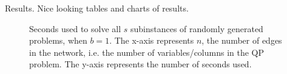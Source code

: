 Results. Nice looking tables and charts of results.
\begin{figure}[ht!]
    \centering
    
    \caption{Seconds used to solve all $s$ subinstances of randomly generated
             problems, when $b = 1$. The x-axis represents $n$, the number of
             edges in the network, i.e. the number of variables/columns in the
             QP problem. The y-axis represents the number of seconds used.}
    \label{fig:constructb1}
\end{figure}
